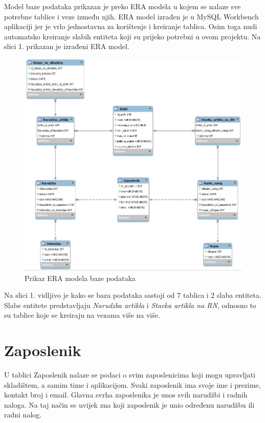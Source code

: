 \documentclass{foi}
\begin{document}
Model baze podataka prikazan je preko ERA modela u kojem se nalaze sve potrebne tablice i veze između njih. ERA model izrađen je u MySQL Workbench aplikaciji jer je vrlo jednostavna za korištenje i kreiranje tablica. Osim toga nudi automatsko kreiranje slabih entiteta koji su prijeko potrebni u ovom projektu. Na slici 1. prikazan je izrađeni ERA model. \begin{figure}[h]
    \centering 
    \includegraphics[width=1.0\textwidth]{slike/ERA.jpeg}
    \caption{Prikaz ERA modela baze podataka}
    \label{slika-1}
\end{figure}

Na slici 1. vidljivo je kako se baza podataka sastoji od 7 tablica i 2 slaba entiteta. Slabe entitete predstavljaju    \emph{Narudzba artikla} i \emph{Stavka artikla na RN}, odnosno to su tablice koje se kreiraju na vezama više na više.
\newpage
\section{Zaposlenik}
U tablici Zaposlenik nalaze se podaci o svim zaposlenicima koji mogu upravljati skladištem, a samim time i aplikacijom. Svaki zaposlenik ima svoje ime i prezime, kontakt broj i email. Glavna svrha zaposlenika je unos svih narudžbi i radnih naloga. Na taj način se uvijek zna koji zaposlenik je unio određenu narudžbu ili radni nalog.
\end{document}
